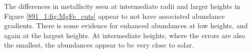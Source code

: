 The differences in metallicity seen at intermediate radii and larger
heights in Figure \ref{891_1:fig:MgFe_cuts} appear to not have associated
abundance gradients.  There is some evidence for enhanced abundances
at low heights, and again at the largest heights. At intermediate
heights, where the errors are also the smallest, the abundances appear
to be very close to solar.






